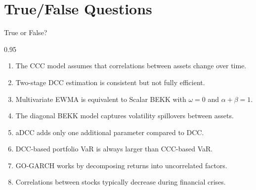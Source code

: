 \documentclass[9pt, aspectratio=169, t]{beamer}
\begin{document}
\section{True/False Questions}

\begin{frame}{True or False?}
    \begin{cminipage}{0.95\textwidth}
    \begin{enumerate}\setlength{\itemsep}{0pt}
        \item The CCC model assumes that correlations between assets change over time.

        \vspace{0.3cm}

        \item Two-stage DCC estimation is consistent but not fully efficient.

        \vspace{0.3cm}

        \item Multivariate EWMA is equivalent to Scalar BEKK with $\omega = 0$ and $\alpha + \beta = 1$.

        \vspace{0.3cm}

        \item The diagonal BEKK model captures volatility spillovers between assets.

        \vspace{0.3cm}

        \item aDCC adds only one additional parameter compared to DCC.

        \vspace{0.3cm}

        \item DCC-based portfolio VaR is always larger than CCC-based VaR.

        \vspace{0.3cm}

        \item GO-GARCH works by decomposing returns into uncorrelated factors.

        \vspace{0.3cm}

        \item Correlations between stocks typically decrease during financial crises.
    \end{enumerate}
    \end{cminipage}
\end{frame}
\end{document}
